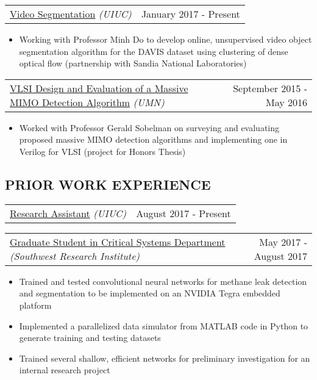 \documentclass[10pt, letterpaper]{article}
\makeatletter
\newcommand{\headerrow}[2]
{\begin{tabular*}{\linewidth}{l@{\extracolsep{\fill}}r}
	#1 &
	#2 \\
\end{tabular*}}
\newcommand{\sansserif}{\cabin}
\makeatother
\begin{document}
\headerrow
	{\uline{Video Segmentation} \textit{(UIUC)}}
	{January 2017 - Present}
	\begin{itemize}
		\item
		Working with Professor Minh Do to develop online, unsupervised video object segmentation algorithm for the DAVIS dataset using clustering of dense optical flow (partnership with Sandia National Laboratories)	
	\end{itemize}

\headerrow
	{\uline{VLSI Design and Evaluation of a Massive MIMO Detection Algorithm} \textit{(UMN)}}
	{September 2015 - May 2016}
	\begin{itemize}
		\item
		Worked with Professor Gerald Sobelman on surveying and evaluating proposed massive MIMO detection algorithms and implementing one in Verilog for VLSI (project for Honors Thesis) 
	\end{itemize}


\subsection*{\sansserif PRIOR WORK EXPERIENCE}

\headerrow
	{\uline{Research Assistant} \textit{(UIUC)}}
	{August 2017 - Present}
	\begin{comment}
	\begin{itemize}
		\item Developed online algorithm for unsupervised video object segmentation based on clustering of dense optical flow
		\item Investigated real-time trackers based on discriminative correlation filters
        \item Developed RADAR-video fusion algorithms to generate high
resolution depth maps using electronically scanning RADAR (ESR) sensors found on
modern cars paired with video
	\end{itemize}
	\end{comment}
	\newline %

\headerrow
	{\uline{Graduate Student in Critical Systems Department} \textit{(Southwest Research Institute)}}
	{May 2017 - August 2017}
	\begin{itemize}
		\item Trained and tested convolutional neural networks for methane leak detection and segmentation to be implemented on an NVIDIA Tegra embedded platform
		\item Implemented a parallelized data simulator from MATLAB code in Python to generate training and testing datasets
		\item Trained several shallow, efficient networks for preliminary investigation for an internal research project
	\end{itemize}
\end{document}
